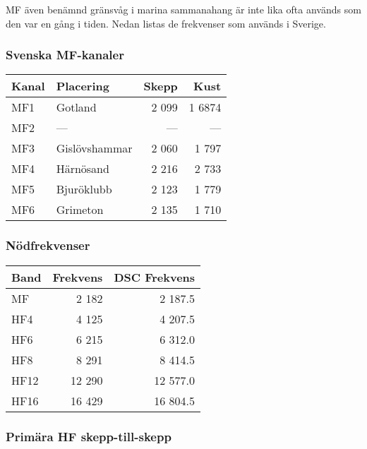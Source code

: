 MF även benämnd gränsvåg i marina sammanahang är inte lika ofta används som den var en gång i tiden. Nedan listas de frekvenser som används i Sverige.

\subsubsection{Svenska MF-kanaler}

\begin{longtable}{llrr}
\textbf{Kanal} & \textbf{Placering} & \textbf{Skepp} & \textbf{Kust}  \\ \hline 
\endhead

MF1 & Gotland       & 2 099 & 1 6874 \\
MF2 & ---           & ---  & ---   \\
MF3 & Gislövshammar & 2 060 & 1 797  \\
MF4 & Härnösand     & 2 216 & 2 733  \\
MF5 & Bjuröklubb    & 2 123 & 1 779  \\
MF6 & Grimeton      & 2 135 & 1 710
\end{longtable}

\subsubsection{Nödfrekvenser}

\begin{longtable}{lrr}
\textbf{Band} & \textbf{Frekvens} & \textbf{DSC Frekvens}\\ \hline \endhead

MF   & 2 182  & 2 187.5  \\
HF4  & 4 125  & 4 207.5  \\
HF6  & 6 215  & 6 312.0  \\
HF8  & 8 291  & 8 414.5  \\
HF12 & 12 290 & 12 577.0 \\
HF16 & 16 429 & 16 804.5 \\
\end{longtable}

\subsubsection{Primära HF skepp-till-skepp}

